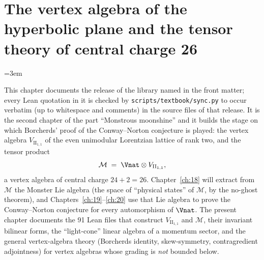 \chapter{The vertex algebra of the hyperbolic plane and the tensor theory of central charge 26}\label{ch:17}
\begingroup
\emergencystretch=3em
\providecommand{\chseventeenL}[1]{\texttt{\directlua{ local s = "\luaescapestring{\detokenize{#1}}" local first = true for c in s:gmatch(utf8.charpattern) do if (not first) and c:match("^[A-Z]$") then tex.sprint("\string\\allowbreak{}") end tex.sprint(-2, c) if c == "_" or c == "." then tex.sprint("\string\\allowbreak{}") end first = false end}}}

\providecommand{\chseventeenII}{{\mathrm{II}_{1,1}}}
\providecommand{\chseventeenVII}{{V_{\mathrm{II}_{1,1}}}}
\providecommand{\chseventeenvac}{\mathbb{1}}
\providecommand{\chseventeenF}{\mathcal{F}}
\providecommand{\chseventeenM}{\mathcal{M}}

This chapter documents the release of the library named in the front matter; every Lean quotation in it is checked by
\texttt{scripts/textbook/sync.py} to occur verbatim (up to whitespace and comments) in the source files of that
release.  It is
the second chapter of the part ``Monstrous moonshine'' and it builds the stage on which Borcherds' proof
of the Conway--Norton conjecture is played: the vertex algebra $\chseventeenVII$ of the even unimodular
Lorentzian lattice of rank two, and the tensor product
\begin{equation*}
  \chseventeenM \;=\; \Vnat\otimes\chseventeenVII ,
\end{equation*}
a vertex algebra of central charge $24+2=26$.  Chapter~\ref{ch:18} will extract from $\chseventeenM$ the
Monster Lie algebra (the space of ``physical states'' of $\chseventeenM$, by the no-ghost theorem), and
Chapters~\ref{ch:19}--\ref{ch:20} use that Lie algebra to prove the Conway--Norton conjecture for every
automorphism of $\Vnat$.  The present chapter documents the 91 Lean files that construct
$\chseventeenVII$ and $\chseventeenM$, their invariant bilinear forms, the ``light-cone'' linear algebra of a
momentum sector, and the general vertex-algebra theory (Borcherds identity, skew-symmetry, contragredient
adjointness) for vertex algebras whose grading is \emph{not} bounded below.

